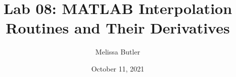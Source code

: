 \newcommand{\course}{MATH 3341}
\title{Lab 08: MATLAB Interpolation Routines and Their Derivatives}
\author{Melissa Butler}
\date{October 11, 2021}
